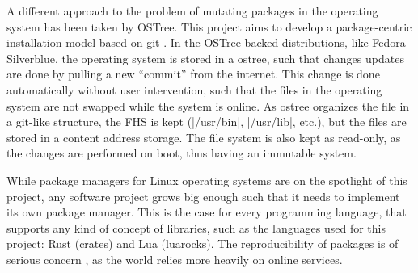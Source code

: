 A different approach to the problem of mutating packages in
the operating system has been taken by OSTree. This project
aims to develop a package-centric installation model based
on git \cite{waltersFutureContinuousIntegration2013} . In
the OSTree-backed distributions, like Fedora Silverblue, the
operating system is stored in a ostree, such that changes
updates are done by pulling a new ``commit'' from the
internet. This change is done automatically without user
intervention, such that the files in the operating system
are not swapped while the system is online. As ostree
organizes the file in a git-like structure, the \ac{FHS} is
kept (|/usr/bin|, |/usr/lib|, etc.), but the files are stored
in a content address storage. The file system is also kept
as read-only, as the changes are performed on boot, thus
having an immutable system.

While package managers for Linux operating systems are on
the spotlight of this project, any software project grows
big enough such that it needs to implement its own package
manager. This is the case for every programming language,
that supports any kind of concept of libraries, such as the
languages used for this project: Rust (crates) and Lua
(luarocks). The reproducibility of packages is of serious
concern \cite{goswamiInvestigatingReproducibilityNPM2020}, as the world relies more heavily on online
services.
